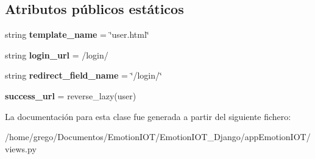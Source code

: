 \subsection*{Atributos públicos estáticos}
\begin{DoxyCompactItemize}
\item 
string {\bfseries template\+\_\+name} = \char`\"{}user.\+html\char`\"{}\hypertarget{classappEmotionIOT_1_1views_1_1User_add80a5846f4b61ec1dca9867774cf246}{}\label{classappEmotionIOT_1_1views_1_1User_add80a5846f4b61ec1dca9867774cf246}

\item 
string {\bfseries login\+\_\+url} = \textquotesingle{}/login/\textquotesingle{}\hypertarget{classappEmotionIOT_1_1views_1_1User_a3b1f0b1939f9f5074221600ed76f47a3}{}\label{classappEmotionIOT_1_1views_1_1User_a3b1f0b1939f9f5074221600ed76f47a3}

\item 
string {\bfseries redirect\+\_\+field\+\_\+name} = \char`\"{}/login/\char`\"{}\hypertarget{classappEmotionIOT_1_1views_1_1User_a980738789814ddbffe54d0c09c43c33f}{}\label{classappEmotionIOT_1_1views_1_1User_a980738789814ddbffe54d0c09c43c33f}

\item 
{\bfseries success\+\_\+url} = reverse\+\_\+lazy(\textquotesingle{}user\textquotesingle{})\hypertarget{classappEmotionIOT_1_1views_1_1User_a444353ee01a14830bcd6bdba445073e6}{}\label{classappEmotionIOT_1_1views_1_1User_a444353ee01a14830bcd6bdba445073e6}

\end{DoxyCompactItemize}


La documentación para esta clase fue generada a partir del siguiente fichero\+:\begin{DoxyCompactItemize}
\item 
/home/grego/\+Documentos/\+Emotion\+I\+O\+T/\+Emotion\+I\+O\+T\+\_\+\+Django/app\+Emotion\+I\+O\+T/views.\+py\end{DoxyCompactItemize}

